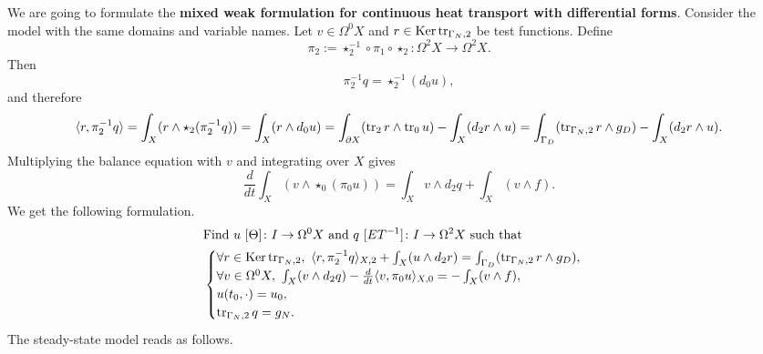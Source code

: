 \begin{discussion}
  We are going to formulate the \textbf{mixed weak formulation for continuous
  heat transport with differential forms}.
  Consider the model
  with the same domains and variable names.
  Let $v \in \Omega^0 X$ and $r \in \mathop{\rm Ker}\nolimits \mathop{\rm tr}\nolimits_{\Gamma_N, 2}$ be test functions.
  Define
  \begin{equation}
    \pi_2 :=
    \star_2^{-1} \circ \pi_1 \circ \star_2 \colon \Omega^2 X \to \Omega^2 X.
  \end{equation}
  Then
  \begin{equation}
    \pi_2^{-1} q = \star_2^{-1} (d_0 u),
  \end{equation}
  and therefore
  \begin{equation}
    \langle r,\pi_2^{-1} q\rangle
    = \int_X (r \wedge \star_2 (\pi_2^{-1} q))
    = \int_X (r \wedge d_0 u)
    = \int_{\partial X} (\mathop{\rm tr}\nolimits_2 r \wedge \mathop{\rm tr}\nolimits_0 u) - \int_{X} (d_2 r \wedge u)
    = \int_{\Gamma_D} (\mathop{\rm tr}\nolimits_{\Gamma_N, 2} r \wedge g_D)
    - \int_{X} (d_2 r \wedge u).
  \end{equation}
  Multiplying the balance equation with $v$ and integrating over $X$ gives
  \begin{equation}
    \frac{d}{d t} \int_X (v \wedge \star_0 (\pi_0 u))
    = \int_X v \wedge d_2 q + \int_X (v \wedge f).
  \end{equation}
  We get the following formulation.
  \begin{equation}
    \begin{split}
      & \text{Find $u\ [\Theta] \colon I \to \Omega^0 X$ and
        $q\ [E T^{-1}] \colon I \to \Omega^2 X$ such that} \\
      &
      \begin{cases}
        \forall r \in \mathop{\rm Ker}\nolimits \mathop{\rm tr}\nolimits_{\Gamma_N, 2},\
          \langle r,\pi_2^{-1} q\rangle_{X, 2} + \int_{X} (u \wedge d_2 r)
          = \int_{\Gamma_D} (\mathop{\rm tr}\nolimits_{\Gamma_N, 2} r \wedge g_D), \\
        \forall v \in \Omega^0 X,\
          \int_X (v \wedge d_2 q)
          - \frac{d}{d t} \langle v,\pi_0 u\rangle_{X, 0}
          = - \int_X (v \wedge f), \\
        u(t_0, \cdot) = u_0, \\
        \mathop{\rm tr}\nolimits_{\Gamma_N, 2} q = g_N.
      \end{cases}
    \end{split}
  \end{equation}
  The steady-state model reads as follows.

\end{discussion}
